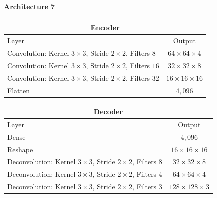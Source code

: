 \paragraph{Architecture 7}

\begin{center}
    \begin{table}[H]
        \centering
        \begin{tabular}{ | l | c | }
            \multicolumn{2}{c}{Encoder} \\ \hline
            Layer & Output\\ \hline
            Convolution: Kernel $3\times3$, Stride $2\times2$, Filters $8  $    & $64\times 64\times 4  $    \\  
            Convolution: Kernel $3\times3$, Stride $2\times2$, Filters $16 $    & $32\times 32\times 8  $    \\
            Convolution: Kernel $3\times3$, Stride $2\times2$, Filters $32 $    & $16\times 16\times 16 $    \\
            Flatten                                                             & $4,096$                    \\
            \hline
        \end{tabular} 
    \end{table}
\end{center}
\vspace{-4em}
\begin{center}
    \begin{table}[H]
        \centering
        \begin{tabular}{ | l | c | }
            \multicolumn{2}{c}{Decoder} \\ \hline
            Layer & Output\\ \hline
            Dense                                                                   & $4,096$                   \\
            Reshape                                                                 & $16\times 16\times  16 $  \\
            Deconvolution: Kernel $3\times3$, Stride $2\times2$, Filters $8  $      & $32\times 32\times  8  $  \\
            Deconvolution: Kernel $3\times3$, Stride $2\times2$, Filters $4  $      & $64\times 64\times  4  $  \\
            Deconvolution: Kernel $3\times3$, Stride $2\times2$, Filters $3  $      & $128\times 128\times3  $  \\
            \hline
        \end{tabular} 
    \end{table}
\end{center}


